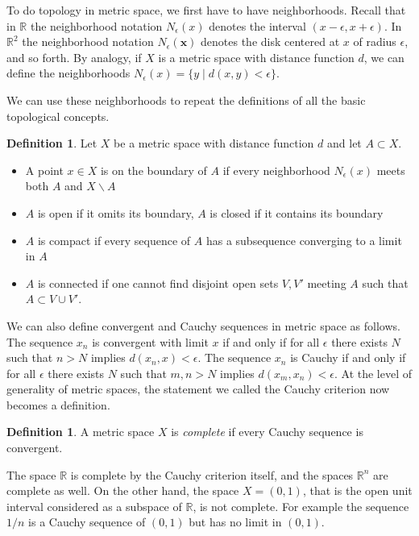 \documentclass[11pt,oneside]{amsbook}
\newcommand{\R}{\mathbb R}
\renewcommand{\setminus}{\smallsetminus}
\theoremstyle{definition}
\theoremstyle{plain}
\theoremstyle{definition}
\newtheorem{definition}[theorem]{Definition}
\theoremstyle{remark}
\numberwithin{equation}{section}
\numberwithin{figure}{section}
\begin{document}
To do topology in metric space, we first have to have neighborhoods. Recall that in $\R$ the neighborhood notation $N_\epsilon(x)$ denotes the interval $(x-\epsilon,x+\epsilon)$. In $\R^2$ the neighborhood notation $N_\epsilon(\mathbf{x})$ denotes the disk centered at $x$ of radius $\epsilon$, and so forth. By analogy, if $X$ is a metric space with distance function $d$, we can define the neighborhoods $N_\epsilon(x)=\{y\mid d(x,y)<\epsilon\}$.

We can use these neighborhoods to repeat the definitions of all the basic topological concepts.

\begin{definition}
  Let $X$ be a metric space with distance function $d$ and let $A\subset X$.
  \begin{itemize}
  \item A point $x\in X$ is on the boundary of $A$ if every neighborhood $N_\epsilon(x)$ meets both $A$ and $X\setminus A$
  \item $A$ is open if it omits its boundary, $A$ is closed if it contains its boundary
  \item $A$ is compact if every sequence of $A$ has a subsequence converging to a limit in $A$
  \item $A$ is connected if one cannot find disjoint open sets $V,V'$ meeting $A$ such that $A\subset V\cup V'$.
  \end{itemize}
\end{definition}


We can also define convergent and Cauchy sequences in metric space as follows. The sequence $x_n$ is convergent with limit $x$ if and only if for all $\epsilon$ there exists $N$ such that $n>N$ implies $d(x_n,x)<\epsilon$. The sequence $x_n$ is Cauchy if and only if for all $\epsilon$ there exists $N$ such that $m,n>N$ implies $d(x_m,x_n)<\epsilon$. At the level of generality of metric spaces, the statement we called the Cauchy criterion now becomes a definition.

\begin{definition}
  A metric space $X$ is \emph{complete} if every Cauchy sequence is convergent.
\end{definition}

The space $\R$ is complete by the Cauchy criterion itself, and the spaces $\R^n$ are complete as well. On the other hand, the space $X=(0,1)$, that is the open unit interval considered as a subspace of $\R$, is not complete. For example the sequence $1/n$ is a Cauchy sequence of $(0,1)$ but has no limit in $(0,1)$.
\end{document}
